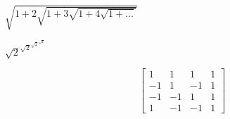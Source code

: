 \documentclass{article}
\begin{document}
	
	$\sqrt{1+2\sqrt{1+3\sqrt{1+4\sqrt{1+...}}}}$
	
	$\sqrt{2}^{\sqrt{2}^{\sqrt{2}^{\sqrt{2}^{...}}}}$
	
	\[
	\begin{bmatrix}
		1 & 1 & 1 & 1 \\
		-1 & 1 & -1 & 1 \\
		-1 & -1 & 1 & 1 \\
		1 & -1 & -1 & 1
	\end{bmatrix}
	\]
	
\end{document}
